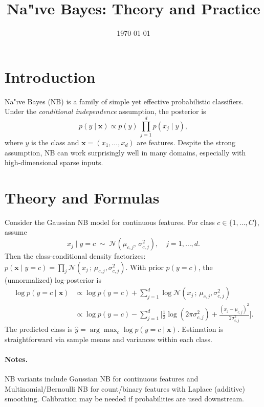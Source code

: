 \documentclass[11pt]{article}
\title{Na"\i ve Bayes: Theory and Practice}
\author{}
\date{\today}
\begin{document}
\maketitle

\section{Introduction}
Na"\i ve Bayes (NB) is a family of simple yet effective probabilistic classifiers.
Under the \emph{conditional independence} assumption, the posterior is
\begin{equation}
 p(y\mid \mathbf{x}) \propto p(y)\,\prod_{j=1}^{d} p(x_j \mid y),
\end{equation}
where $y$ is the class and $\mathbf{x}=(x_1,\dots,x_d)$ are features. Despite the strong assumption, NB can work surprisingly well in many domains, especially with high-dimensional sparse inputs.

\section{Theory and Formulas}
Consider the Gaussian NB model for continuous features. For class $c\in\{1,\dots,C\}$, assume
\begin{equation}
 x_j \mid y=c \;\sim\; \mathcal{N}(\mu_{c,j},\, \sigma^2_{c,j}),\quad j=1,\dots,d.
\end{equation}
Then the class-conditional density factorizes: $p(\mathbf{x}\mid y=c)=\prod_{j} \mathcal{N}(x_j\,;\,\mu_{c,j},\sigma^2_{c,j})$. With prior $p(y=c)$, the (unnormalized) log-posterior is
\begin{align}
 \log p(y=c\mid \mathbf{x}) 
 &\propto \log p(y=c) + \sum_{j=1}^d \log \mathcal{N}(x_j\,;\,\mu_{c,j},\sigma^2_{c,j})\\
 &\propto \log p(y=c) - \sum_{j=1}^d \Big[ \tfrac{1}{2}\log (2\pi\sigma^2_{c,j}) + \tfrac{(x_j-\mu_{c,j})^2}{2\sigma^2_{c,j}} \Big].
\end{align}
The predicted class is $\hat y = \arg\max_c \log p(y=c\mid \mathbf{x})$. Estimation is straightforward via sample means and variances within each class.

\paragraph{Notes.} NB variants include Gaussian NB for continuous features and Multinomial/Bernoulli NB for count/binary features with Laplace (additive) smoothing. Calibration may be needed if probabilities are used downstream.
\end{document}
